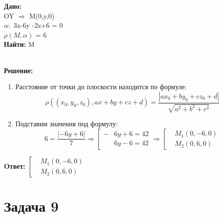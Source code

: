\documentclass{article}
\begin{document}
\begin{minipage}[t]{0.45\textwidth}

\textbf{Дано:}\\ 
OY $\Rightarrow$ M(0,y,0)\\ 
$\alpha:$ 3x-6y -2z+6 = 0\\ 
$\rho(M,\alpha)$ = 6\\
\textbf{Найти: }M
\end{minipage}
\begin{minipage}[t]{0.45\textwidth}
  \vspace{-\baselineskip} %

\begin{center}
\end{center}
\end{minipage}
\\
\textbf{Решение:}
\begin{enumerate}
  \item Расстояние от точки до плоскости находится по формуле:
    \[
      \rho((x_0,y_0,z_0),ax+by+cz+d) = \frac{|ax_0+by_0+cz_0+d|}{\sqrt{a^2+b^2+c^2}}
    \]
  \item Подставим значения под формулу:
    \[
      6 = \frac{|-6y + 6|}{7} \Rightarrow \left[\begin{aligned}
        -&6y+6 = 42\\ 
        &6y -6 = 42
      \end{aligned} \right.
\Rightarrow \left[\begin{aligned}
      &M_1(0,-6,0)\\ 
      &M_2(0,6,0)
      \end{aligned} \right.
    \]
\end{enumerate}

\textbf{Oтвет: } 
$\left[\begin{aligned}
        &M_1(0,-6,0)\\ 
        &M_2(0,6,0)
      \end{aligned} \right.$ 


\section*{Задача 9}
\end{document}
